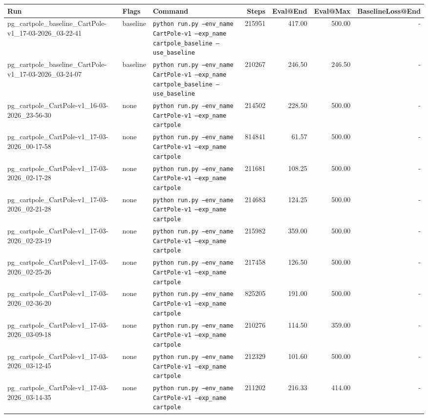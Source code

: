 \begin{table}[h]
\centering
\small
\begin{tabular}{l l l r r r r}
\hline
Run & Flags & Command & Steps & Eval@End & Eval@Max & BaselineLoss@End \\
\hline
pg\_cartpole\_baseline\_CartPole-v1\_17-03-2026\_03-22-41 & baseline & \texttt{python run.py --env\_name CartPole-v1 --exp\_name cartpole\_baseline --use\_baseline} & 215951 & 417.00 & 500.00 & - \\
pg\_cartpole\_baseline\_CartPole-v1\_17-03-2026\_03-24-07 & baseline & \texttt{python run.py --env\_name CartPole-v1 --exp\_name cartpole\_baseline --use\_baseline} & 210267 & 246.50 & 246.50 & - \\
pg\_cartpole\_CartPole-v1\_16-03-2026\_23-56-30 & none & \texttt{python run.py --env\_name CartPole-v1 --exp\_name cartpole} & 214502 & 228.50 & 500.00 & - \\
pg\_cartpole\_CartPole-v1\_17-03-2026\_00-17-58 & none & \texttt{python run.py --env\_name CartPole-v1 --exp\_name cartpole} & 814841 & 61.57 & 500.00 & - \\
pg\_cartpole\_CartPole-v1\_17-03-2026\_02-17-28 & none & \texttt{python run.py --env\_name CartPole-v1 --exp\_name cartpole} & 211681 & 108.25 & 500.00 & - \\
pg\_cartpole\_CartPole-v1\_17-03-2026\_02-21-28 & none & \texttt{python run.py --env\_name CartPole-v1 --exp\_name cartpole} & 214683 & 124.25 & 500.00 & - \\
pg\_cartpole\_CartPole-v1\_17-03-2026\_02-23-19 & none & \texttt{python run.py --env\_name CartPole-v1 --exp\_name cartpole} & 215982 & 359.00 & 500.00 & - \\
pg\_cartpole\_CartPole-v1\_17-03-2026\_02-25-26 & none & \texttt{python run.py --env\_name CartPole-v1 --exp\_name cartpole} & 217458 & 126.50 & 500.00 & - \\
pg\_cartpole\_CartPole-v1\_17-03-2026\_02-36-20 & none & \texttt{python run.py --env\_name CartPole-v1 --exp\_name cartpole} & 825205 & 191.00 & 500.00 & - \\
pg\_cartpole\_CartPole-v1\_17-03-2026\_03-09-18 & none & \texttt{python run.py --env\_name CartPole-v1 --exp\_name cartpole} & 210276 & 114.50 & 359.00 & - \\
pg\_cartpole\_CartPole-v1\_17-03-2026\_03-12-45 & none & \texttt{python run.py --env\_name CartPole-v1 --exp\_name cartpole} & 212329 & 101.60 & 500.00 & - \\
pg\_cartpole\_CartPole-v1\_17-03-2026\_03-14-35 & none & \texttt{python run.py --env\_name CartPole-v1 --exp\_name cartpole} & 211202 & 216.33 & 414.00 & - \\

\end{tabular}
\end{table}
